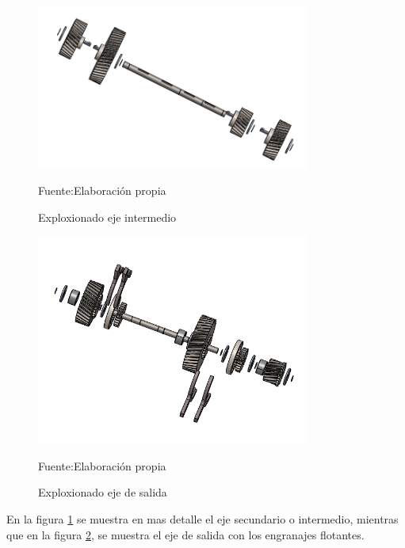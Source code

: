 \begin{figure}[ht!]
    \centering
    \includegraphics[width =0.8\textwidth]{Cap5_DisenoDetallado/Figuras/eje_intermedio.png}
    \caption{Exploxionado eje intermedio}{Fuente:Elaboración propia}
    \label{fig:eje_inter}
\end{figure}
\begin{figure}[ht!]
    \centering
    \includegraphics[width =0.8\textwidth]{Cap5_DisenoDetallado/Figuras/eje_de_salida.png}
    \caption{Exploxionado eje de salida}{Fuente:Elaboración propia}
    \label{fig:Eje_salida}
\end{figure}
En la figura \ref{fig:eje_inter} se muestra en mas detalle el eje secundario o intermedio, mientras que en la figura \ref{fig:Eje_salida}, se muestra el eje de salida con los engranajes flotantes.



\newpage
~
\newpage

